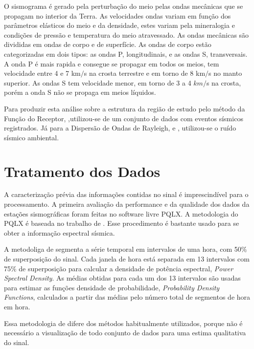 O sismograma é gerado pela perturbação do meio pelas ondas  mecânicas que se propagam no interior da Terra. As velocidades ondas variam em função dos parâmetros elásticos do meio e da densidade, estes variam pela mineralogia e condições de pressão e temperatura do meio atravessado. As ondas mecânicas são divididas em ondas de corpo e de superfície. As ondas de corpo estão categorizadas em dois tipos: as ondas P, longitudinais, e as ondas S, transversais. A onda P é mais rapida e consegue se propagar em todos os meios, tem velocidade entre 4 e 7 km$/$s na crosta terrestre e em torno de 8 km$/$s no manto superior. As ondas S tem velocidade menor, em torno de 3 a 4 $km/$s na crosta, porém a onda S não se propaga em meios líquidos.

Para produzir esta análise sobre a estrutura da região de estudo pelo método da Função do Receptor, \cite{langston_structure_1979},utilizou-se de um conjunto de dados com eventos sísmicos registrados. Já para a Dispersão de Ondas de Rayleigh, \cite{campillo_long-range_2003} e \cite{shapiro_emergence_2004}, utilizou-se o ruído sísmico ambiental.

\section{Tratamento dos Dados}

A caracterização prévia das informações contidas no sinal é imprescindível para o processamento. A primeira avaliação da performance e da qualidade dos dados da estações sismográficas foram feitas no software livre PQLX.  A metodologia do PQLX é baseada no trabalho de \cite{McNamara_Buland_2004}. Esse procedimento é bastante usado para se obter a informação espectral sísmica.

A metodoliga de \cite{McNamara_Buland_2004} segmenta a série temporal em intervalos de uma hora, com 50\% de superposição do sinal. Cada janela de hora está separada em 13 intervalos com 75\% de superposição para calcular a densidade de potência espectral, \textit{Power Spectral Density}. As médias obtidas para cada um dos 13 intervalos são usadas para estimar as funções densidade de probabilidade, \textit{Probability Density Functions}, calculados a partir das médias pelo número total de segmentos de hora em hora. 

Essa metodologia de \cite{McNamara_Buland_2004} difere dos métodos habitualmente utilizados, porque não é necessário a visualização de todo conjunto de dados para uma estima qualitativa do sinal.

